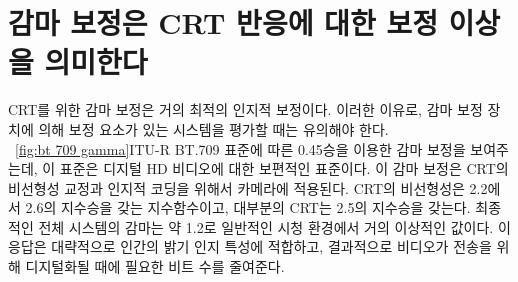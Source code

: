 \section{감마 보정은 CRT 반응에 대한 보정 이상을 의미한다}
CRT를 위한 감마 보정은 거의 최적의 인지적 보정이다. 이러한 이유로, 감마 보정 장치에 의해 보정 요소가 있는 시스템을 평가할 때는 유의해야 한다.
\\
\figurename~\ref{fig:bt 709 gamma}\는 ITU-R BT.709 표준에 따른 0.45승을 이용한 감마 보정을 보여주는데, 이 표준은 디지털 HD 비디오에 대한 보편적인 표준이다.
이 감마 보정은 CRT의 비선형성 교정과 인지적 코딩을 위해서 카메라에 적용된다. CRT의 비선형성은 2.2에서 2.6의 지수승을 갖는 지수함수이고, 대부분의 CRT는 2.5의 지수승을 갖는다.
최종적인 전체 시스템의 감마는 약 1.2로 일반적인 시청 환경에서 거의 이상적인 값이다. 이 응답은 대략적으로 인간의 밝기 인지 특성에 적합하고, 결과적으로 비디오가 전송을 위해 디지털화될 때에 필요한 비트 수를 줄여준다.

